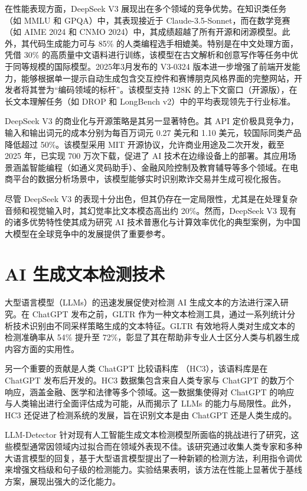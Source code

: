 在性能表现方面，DeepSeek V3 展现出在多个领域的竞争优势。在知识类任务（如 MMLU 和 GPQA）中，其表现接近于 Claude-3.5-Sonnet，而在数学竞赛（如 AIME 2024 和 CNMO 2024）中，其成绩超越了所有开源和闭源模型。此外，其代码生成能力可与 85\% 的人类编程选手相媲美。特别是在中文处理方面，凭借 30\% 的高质量中文语料进行训练，该模型在古文解析和创意写作等任务中优于同等规模的国际模型。2025年3月发布的 V3-0324 版本进一步增强了前端开发能力，能够根据单一提示自动生成包含交互控件和赛博朋克风格界面的完整网站，开发者将其誉为“编码领域的标杆”。该模型支持 128K 的上下文窗口（开源版），在长文本理解任务（如 DROP 和 LongBench v2）中的平均表现领先于行业标准。

DeepSeek V3 的商业化与开源策略是其另一显著特色。其 API 定价极具竞争力，输入和输出词元的成本分别为每百万词元 0.27 美元和 1.10 美元，较国际同类产品降低超过 50\%。该模型采用 MIT 开源协议，允许商业用途及二次开发，截至 2025 年，已实现 700 万次下载，促进了 AI 技术在边缘设备上的部署。其应用场景涵盖智能编程（如通义灵码助手）、金融风险控制及教育辅导等多个领域。在电商平台的数据分析场景中，该模型能够实时识别欺诈交易并生成可视化报告。

尽管 DeepSeek V3 的表现十分出色，但其仍存在一定局限性，尤其是在处理复杂音频和视觉输入时，其幻觉率比文本模态高出约 20\%。然而，DeepSeek V3 现有的诸多优势特性使其成为研究 AI 技术普惠化与计算效率优化的典型案例，为中国大模型在全球竞争中的发展提供了重要参考。

\section{AI 生成文本检测技术}
\label{sec:llmdetect}

大型语言模型（LLMs）的迅速发展促使对检测 AI 生成文本的方法进行深入研究。在 ChatGPT 发布之前，GLTR \cite{gehrmann_gltr_2019} 作为一种文本检测工具，通过一系列统计分析技术识别由不同采样策略生成的文本特征。GLTR 有效地将人类对生成文本的检测准确率从 54\% 提升至 72\%，彰显了其在帮助非专业人士区分人类与机器生成内容方面的实用性。

另一个重要的贡献是人类 ChatGPT 比较语料库 \cite{guo_how_2023}（HC3），该语料库是在 ChatGPT 发布后开发的。HC3 数据集包含来自人类专家与 ChatGPT 的数万个响应，涵盖金融、医学和法律等多个领域。这一数据集使得对 ChatGPT 的响应与人类输出进行全面评估成为可能，从而揭示了 LLMs 的能力与局限性。此外，HC3 还促进了检测系统的发展，旨在识别文本是由 ChatGPT 还是人类生成的。

LLM-Detector \cite{wang_llm-detector_2024} 针对现有人工智能生成文本检测模型所面临的挑战进行了研究，这些模型通常因领域内过拟合而在领域外表现不佳。该研究通过收集人类专家和多种大语言模型的回复，基于大型语言模型提出了一种新颖的检测方法，利用指令调优来增强文档级和句子级的检测能力。实验结果表明，该方法在性能上显著优于基线方案，展现出强大的泛化能力。


